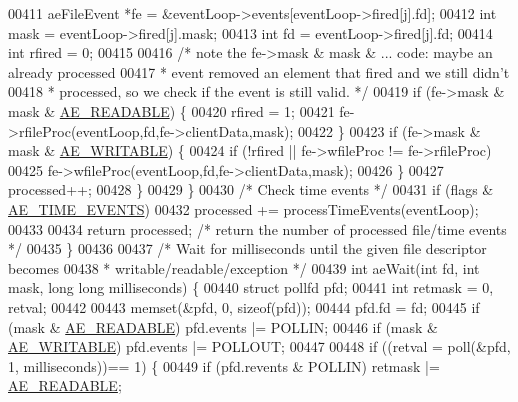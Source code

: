 \begin{DoxyCode}
00411             aeFileEvent *fe = &eventLoop->events[eventLoop->fired[j].fd];
00412             \textcolor{keywordtype}{int} mask = eventLoop->fired[j].mask;
00413             \textcolor{keywordtype}{int} fd = eventLoop->fired[j].fd;
00414             \textcolor{keywordtype}{int} rfired = 0;
00415 
00416         \textcolor{comment}{/* note the fe->mask & mask & ... code: maybe an already processed}
00417 \textcolor{comment}{             * event removed an element that fired and we still didn't}
00418 \textcolor{comment}{             * processed, so we check if the event is still valid. */}
00419             \textcolor{keywordflow}{if} (fe->mask & mask & \hyperlink{ae_8h_a7a9a2162d007d09739955b4e55c65bf3}{AE\_READABLE}) \{
00420                 rfired = 1;
00421                 fe->rfileProc(eventLoop,fd,fe->clientData,mask);
00422             \}
00423             \textcolor{keywordflow}{if} (fe->mask & mask & \hyperlink{ae_8h_ab6bfb0366ccb6277112d132c2a2bf500}{AE\_WRITABLE}) \{
00424                 \textcolor{keywordflow}{if} (!rfired || fe->wfileProc != fe->rfileProc)
00425                     fe->wfileProc(eventLoop,fd,fe->clientData,mask);
00426             \}
00427             processed++;
00428         \}
00429     \}
00430     \textcolor{comment}{/* Check time events */}
00431     \textcolor{keywordflow}{if} (flags & \hyperlink{ae_8h_acdc6c5c42302bc81959ed645b22800aa}{AE\_TIME\_EVENTS})
00432         processed += processTimeEvents(eventLoop);
00433 
00434     \textcolor{keywordflow}{return} processed; \textcolor{comment}{/* return the number of processed file/time events */}
00435 \}
00436 
00437 \textcolor{comment}{/* Wait for milliseconds until the given file descriptor becomes}
00438 \textcolor{comment}{ * writable/readable/exception */}
00439 \textcolor{keywordtype}{int} aeWait(\textcolor{keywordtype}{int} fd, \textcolor{keywordtype}{int} mask, \textcolor{keywordtype}{long} \textcolor{keywordtype}{long} milliseconds) \{
00440     \textcolor{keyword}{struct} pollfd pfd;
00441     \textcolor{keywordtype}{int} retmask = 0, retval;
00442 
00443     memset(&pfd, 0, \textcolor{keyword}{sizeof}(pfd));
00444     pfd.fd = fd;
00445     \textcolor{keywordflow}{if} (mask & \hyperlink{ae_8h_a7a9a2162d007d09739955b4e55c65bf3}{AE\_READABLE}) pfd.events |= POLLIN;
00446     \textcolor{keywordflow}{if} (mask & \hyperlink{ae_8h_ab6bfb0366ccb6277112d132c2a2bf500}{AE\_WRITABLE}) pfd.events |= POLLOUT;
00447 
00448     \textcolor{keywordflow}{if} ((retval = poll(&pfd, 1, milliseconds))== 1) \{
00449         \textcolor{keywordflow}{if} (pfd.revents & POLLIN) retmask |= \hyperlink{ae_8h_a7a9a2162d007d09739955b4e55c65bf3}{AE\_READABLE};

\end{DoxyCode}
